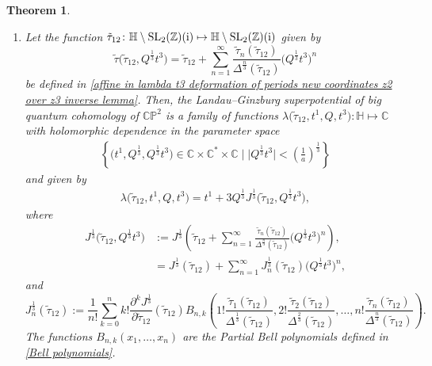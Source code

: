 \documentclass[11pt]{article}
\numberwithin{equation}{section}
\numberwithin{equation}{section}
\newtheorem{Theorem}{Theorem}[section]
\begin{document}
\begin{Theorem}\quad
\begin{enumerate}\itemsep=0pt
\item[$(1)$]
Let the function
$
\tilde\tau_{12}\colon \mathbb{H}\setminus{ {\rm SL}_2(\mathbb{Z})({\rm i})} \mapsto \mathbb{H}\setminus{ {\rm SL}_2(\mathbb{Z})({\rm i})}
$
given by
\[
\tilde\tau\bigl(\tilde\tau_{12},Q^{\frac{1}{3}}t^3\bigr)=\tilde\tau_{12}+\sum_{n=1}^{\infty}\frac{\tilde\tau_{n}(\tilde\tau_{12})}{\Delta^{\frac{n}{3}}(\tilde\tau_{12})} \bigl( Q^{\frac{1}{3}}t^3\bigr)^n
\]
be defined in \eqref{affine in lambda t3 deformation of periods new coordinates z2 over z3 inverse lemma}.
Then, the Landau--Ginzburg superpotential of big quantum cohomology of $\mathbb{CP}^2$ is a family of functions
$
\lambda\bigl(\tilde\tau_{12}, t^1, Q, t^3\bigr)\colon \mathbb{H} \mapsto \mathbb{C}
$
with holomorphic dependence in the parameter space
\begin{gather*}
\left\{\bigl(t^1,Q^{\frac{1}{3}}, Q^{\frac{1}{3}}t^3\bigr) \in \mathbb{C}\times\mathbb{C}^{*}\times \mathbb{C}\mid \big|Q^{\frac{1}{3}}t^3\big|<\left(\frac{1}{a}\right)^{\frac{1}{3}} \right\}
\end{gather*}
and given by
\begin{gather}\label{lg superpotential of small quantum cohomology j function big quantum cohomology main body}
\lambda\bigl(\tilde\tau_{12}, t^1, Q, t^3\bigr)=t^1+3Q^{\frac{1}{3}}J^{\frac{1}{3}}\bigl(\tilde\tau_{12}, Q^{\frac{1}{3}}t^3\bigr),
\end{gather}
where
\begin{align}
J^{\frac{1}{3}}\bigl(\tilde\tau_{12}, Q^{\frac{1}{3}}t^3\bigr)&:=J^{\frac{1}{3}}\left(\tilde\tau_{12}+\sum_{n=1}^{\infty}\frac{\tilde\tau_{n}(\tilde\tau_{12})}{\Delta^{\frac{n}{3}}(\tilde\tau_{12})} \bigl( Q^{\frac{1}{3}}t^3\bigr)^n\right),\nonumber\\
&=J^{\frac{1}{3}}(\tilde\tau_{12})+\sum_{n=1}^{\infty}J_n^{\frac{1}{3}}(\tilde\tau_{12})\bigl( Q^{\frac{1}{3}}t^3\bigr)^n,\label{definition of t3 deformation of gamma2}
\end{align}
and
\[
J_n^{\frac{1}{3}}(\tilde\tau_{12}):=\frac{1}{n!}\sum_{k=0}^n k!\frac{\partial^kJ^{\frac{1}{3}}}{\partial\tilde\tau_{12}}(\tilde\tau_{12}) B_{n,k}\left( 1!\frac{\tilde\tau_{1}(\tilde\tau_{12})}{\Delta^{\frac{1}{3}}(\tilde\tau_{12})} ,2!\frac{\tilde\tau_{2}(\tilde\tau_{12})}{\Delta^{\frac{2}{3}}(\tilde\tau_{12})},\dots,n!\frac{\tilde\tau_{n}(\tilde\tau_{12})}{\Delta^{\frac{n}{3}}(\tilde\tau_{12})}\right).
\]
The functions $B_{n,k}(x_1,\dots,x_n)$ are the Partial Bell polynomials defined in \eqref{Bell polynomials}.


\end{enumerate}
\end{Theorem}
\end{document}
